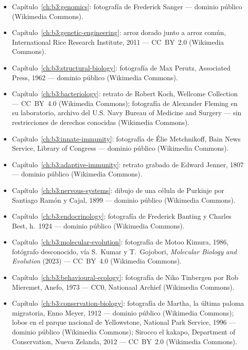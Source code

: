 \begin{itemize}
  \item Capítulo~\ref{ch:b3:genomics}: fotografía de Frederick Sanger
        --- dominio público (Wikimedia Commons).
  \item Capítulo~\ref{ch:b3:genetic-engineering}: arroz dorado junto a
        arroz común, International Rice Research Institute, 2011 ---
        CC~BY~2.0 (Wikimedia Commons).
  \item Capítulo~\ref{ch:b3:structural-biology}: fotografía de Max
        Perutz, Associated Press, 1962 --- dominio público (Wikimedia
        Commons).
  \item Capítulo~\ref{ch:b3:bacteriology}: retrato de Robert Koch,
        Wellcome Collection --- CC~BY~4.0 (Wikimedia Commons);
        fotografía de Alexander Fleming en su laboratorio, archivo del
        U.S. Navy Bureau of Medicine and Surgery --- sin restricciones
        de derechos conocidas (Wikimedia Commons).
  \item Capítulo~\ref{ch:b3:innate-immunity}: fotografía de Élie
        Metchnikoff, Bain News Service, Library of Congress --- dominio
        público (Wikimedia Commons).
  \item Capítulo~\ref{ch:b3:adaptive-immunity}: retrato grabado de
        Edward Jenner, 1807 --- dominio público (Wikimedia Commons).
  \item Capítulo~\ref{ch:b3:nervous-systems}: dibujo de una célula de
        Purkinje por Santiago Ramón y Cajal, 1899 --- dominio público
        (Wikimedia Commons).
  \item Capítulo~\ref{ch:b3:endocrinology}: fotografía de Frederick
        Banting y Charles Best, h.~1924 --- dominio público (Wikimedia
        Commons).
  \item Capítulo~\ref{ch:b3:molecular-evolution}: fotografía de Motoo
        Kimura, 1986, fotógrafo desconocido, vía S.~Kumar y
        T.~Gojobori, \emph{Molecular Biology and Evolution} (2023) ---
        CC~BY~4.0 (Wikimedia Commons).
  \item Capítulo~\ref{ch:b3:behavioural-ecology}: fotografía de Niko
        Tinbergen por Rob Mieremet, Anefo, 1973 --- CC0, Nationaal
        Archief (Wikimedia Commons).
  \item Capítulo~\ref{ch:b3:conservation-biology}: fotografía de
        Martha, la última paloma migratoria, Enno Meyer, 1912 ---
        dominio público (Wikimedia Commons); lobos en el parque
        nacional de Yellowstone, National Park Service, 1996 ---
        dominio público (Wikimedia Commons); Sirocco el kakapo,
        Department of Conservation, Nueva Zelanda, 2012 --- CC~BY~2.0
        (Wikimedia Commons).
\end{itemize}

